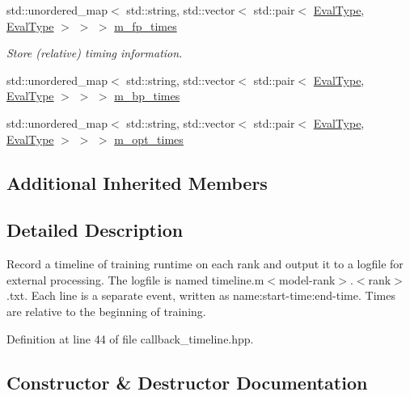 \begin{DoxyCompactItemize}
std\+::unordered\+\_\+map$<$ std\+::string, std\+::vector$<$ std\+::pair$<$ \hyperlink{base_8hpp_a3266f5ac18504bbadea983c109566867}{Eval\+Type}, \hyperlink{base_8hpp_a3266f5ac18504bbadea983c109566867}{Eval\+Type} $>$ $>$ $>$ \hyperlink{classlbann_1_1lbann__callback__timeline_ab43061b16cd5d29045be1d9294a80ef1}{m\+\_\+fp\+\_\+times}
\begin{DoxyCompactList}\small\item\em Store (relative) timing information. \end{DoxyCompactList}\item 
std\+::unordered\+\_\+map$<$ std\+::string, std\+::vector$<$ std\+::pair$<$ \hyperlink{base_8hpp_a3266f5ac18504bbadea983c109566867}{Eval\+Type}, \hyperlink{base_8hpp_a3266f5ac18504bbadea983c109566867}{Eval\+Type} $>$ $>$ $>$ \hyperlink{classlbann_1_1lbann__callback__timeline_a59e63a11f33ed0cf3fd40dd2d8f91ede}{m\+\_\+bp\+\_\+times}
\item 
std\+::unordered\+\_\+map$<$ std\+::string, std\+::vector$<$ std\+::pair$<$ \hyperlink{base_8hpp_a3266f5ac18504bbadea983c109566867}{Eval\+Type}, \hyperlink{base_8hpp_a3266f5ac18504bbadea983c109566867}{Eval\+Type} $>$ $>$ $>$ \hyperlink{classlbann_1_1lbann__callback__timeline_abc57215e52823fe6f44f040f06f60847}{m\+\_\+opt\+\_\+times}
\end{DoxyCompactItemize}
\subsection*{Additional Inherited Members}


\subsection{Detailed Description}
Record a timeline of training runtime on each rank and output it to a logfile for external processing. The logfile is named timeline.\+m$<$model-\/rank$>$.$<$rank$>$.txt. Each line is a separate event, written as name\+:start-\/time\+:end-\/time. Times are relative to the beginning of training. 

Definition at line 44 of file callback\+\_\+timeline.\+hpp.



\subsection{Constructor \& Destructor Documentation}
\mbox{\label{classlbann_1_1lbann__callback__timeline_a51afde4e9dbd97ecb1d40071df16fb78}} 
